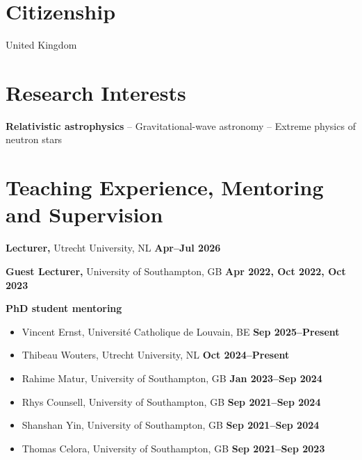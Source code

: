\newcommand{\myname}{Fabian Gittins}



\begin{resume}

\thispagestyle{empty}



\section{Citizenship}

United Kingdom

\section{Research Interests}

\textbf{Relativistic astrophysics} -- Gravitational-wave astronomy -- Extreme
physics of neutron stars









\newpage



\section{Teaching Experience, Mentoring and Supervision}

\textbf{Lecturer,} Utrecht University, NL
\hfill \textbf{Apr--Jul 2026}%

\textbf{Guest Lecturer,} University of Southampton, GB
\hfill \textbf{Apr 2022, Oct 2022, Oct 2023}%

\textbf{PhD student mentoring}
%
\begin{itemize}[nosep]
    \item[] Vincent Ernst, Universit{\'e} Catholique de Louvain, BE
    \hfill \textbf{Sep 2025--Present}
    \item[] Thibeau Wouters, Utrecht University, NL
    \hfill \textbf{Oct 2024--Present}
    \item[] Rahime Matur, University of Southampton, GB
    \hfill \textbf{Jan 2023--Sep 2024}
    \item[] Rhys Counsell, University of Southampton, GB
    \hfill \textbf{Sep 2021--Sep 2024}
    \item[] Shanshan Yin, University of Southampton, GB
    \hfill \textbf{Sep 2021--Sep 2024}
    \item[] Thomas Celora, University of Southampton, GB
    \hfill \textbf{Sep 2021--Sep 2023}
\end{itemize}


\end{resume}
